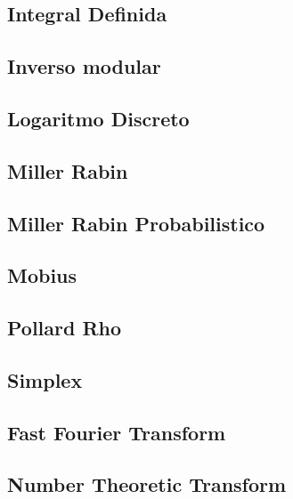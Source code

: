 \subsection{Integral Definida}
\raggedbottom
\hrulefill
\subsection{Inverso modular}
\raggedbottom
\hrulefill
\subsection{Logaritmo Discreto}
\raggedbottom
\hrulefill
\subsection{Miller Rabin}
\raggedbottom
\hrulefill
\subsection{Miller Rabin Probabilistico}
\raggedbottom
\hrulefill
\subsection{Mobius}
\raggedbottom
\hrulefill
\subsection{Pollard	Rho}
\raggedbottom
\hrulefill
\subsection{Simplex}
\raggedbottom
\hrulefill
\subsection{Fast Fourier Transform}
\raggedbottom
\hrulefill
\subsection{Number Theoretic Transform}
\raggedbottom
\hrulefill

